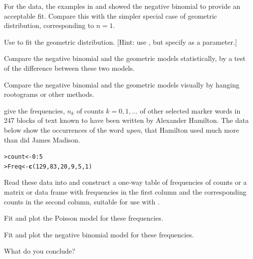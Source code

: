 \documentclass[10pt,krantz2]{krantz}\usepackage[]{graphicx}\usepackage[]{color}
\makeatletter
\newcommand{\hlnum}[1]{\textcolor[rgb]{0.686,0.059,0.569}{#1}}%
\newcommand{\hlopt}[1]{\textcolor[rgb]{0,0,0}{#1}}%
\newcommand{\hlstd}[1]{\textcolor[rgb]{0.345,0.345,0.345}{#1}}%
\newcommand{\hlkwb}[1]{\textcolor[rgb]{0.69,0.353,0.396}{#1}}%
\newcommand{\hlkwd}[1]{\textcolor[rgb]{0.737,0.353,0.396}{\textbf{#1}}}%
\newenvironment{kframe}{%
 \def\at@end@of@kframe{}%
 \ifinner\ifhmode%
  \def\at@end@of@kframe{\end{minipage}}%
  \begin{minipage}{\columnwidth}%
 \fi\fi%
 \def\FrameCommand##1{\hskip\@totalleftmargin \hskip-\fboxsep
 \colorbox{shadecolor}{##1}\hskip-\fboxsep
     \hskip-\linewidth \hskip-\@totalleftmargin \hskip\columnwidth}%
 \MakeFramed {\advance\hsize-\width
   \@totalleftmargin\z@ \linewidth\hsize
   \@setminipage}}%
 {\par\unskip\endMakeFramed%
 \at@end@of@kframe}
\newenvironment{knitrout}{}{} %
\renewenvironment{knitrout}{\small\renewcommand{\baselinestretch}{.85}}{} %
\makeatother
\begin{document}
\begin{Exercises}
  \exercise For the  data, the examples in  and
   showed the negative binomial to provide an acceptable fit.
  Compare this with the simpler special case of geometric distribution, corresponding
  to $n=1$.
  \begin{enumerate*}
    \item Use  to fit the geometric distribution. [Hint: use , but specify  as a parameter.]
    \item Compare the negative binomial and the geometric models statistically,
    by a \LR test of the difference between these two models.
    \item Compare the negative binomial and the geometric models visually
    by hanging rootograms or other methods.
  \end{enumerate*}

  \exercise \citet[Table 2.4]{MostellerWallace:63} give the frequencies, $n_k$
  of counts $k = 0, 1, \dots$ of other selected marker words in 247 blocks
  of text known to have been written by Alexander Hamilton.  The data below
  show the occurrences of the word \emph{upon}, that Hamilton used much more than
  did James Madison.
\begin{knitrout}
\color{fgcolor}\begin{kframe}
\begin{alltt}
\hlstd{> }\hlstd{count} \hlkwb{<-} \hlnum{0} \hlopt{:} \hlnum{5}
\hlstd{> }\hlstd{Freq} \hlkwb{<-} \hlkwd{c}\hlstd{(}\hlnum{129}\hlstd{,} \hlnum{83}\hlstd{,} \hlnum{20}\hlstd{,} \hlnum{9}\hlstd{,} \hlnum{5}\hlstd{,} \hlnum{1}\hlstd{)}
\end{alltt}
\end{kframe}
\end{knitrout}
  \begin{enumerate*}
    \item Read these data into \R and construct a one-way table of frequencies of counts
    or a matrix or data frame with frequencies in the first column and the corresponding counts in the second column, suitable for use with .
    \item Fit and plot the Poisson model for these frequencies.
    \item Fit and plot the negative binomial model for these frequencies.
    \item What do you conclude?
  \end{enumerate*}


\end{Exercises}
\end{document}
